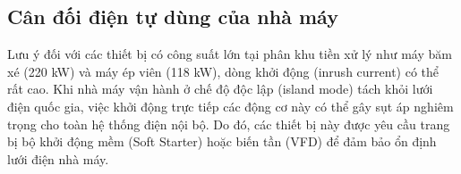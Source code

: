 \documentclass[../main.tex]{subfiles}
\begin{document}


\subsection{Cân đối điện tự dùng của nhà máy}

Lưu ý đối với các thiết bị có công suất lớn tại phân khu tiền xử lý như máy băm xé (220 kW) và máy ép viên (118 kW), dòng khởi động (inrush current) có thể rất cao. Khi nhà máy vận hành ở chế độ độc lập (island mode) tách khỏi lưới điện quốc gia, việc khởi động trực tiếp các động cơ này có thể gây sụt áp nghiêm trọng cho toàn hệ thống điện nội bộ. Do đó, các thiết bị này được yêu cầu trang bị bộ khởi động mềm (Soft Starter) hoặc biến tần (VFD) để đảm bảo ổn định lưới điện nhà máy.
\end{document}
